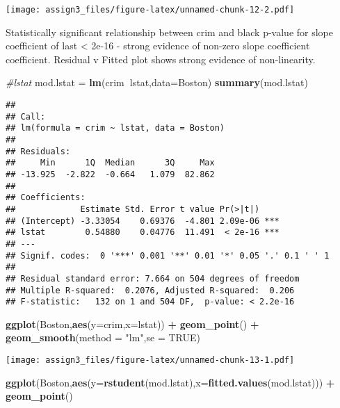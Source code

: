 \documentclass[]{article}
\newenvironment{Shaded}{\begin{snugshade}}{\end{snugshade}}
\newcommand{\CommentTok}[1]{\textcolor[rgb]{0.56,0.35,0.01}{\textit{#1}}}
\newcommand{\DataTypeTok}[1]{\textcolor[rgb]{0.13,0.29,0.53}{#1}}
\newcommand{\KeywordTok}[1]{\textcolor[rgb]{0.13,0.29,0.53}{\textbf{#1}}}
\newcommand{\NormalTok}[1]{#1}
\newcommand{\OperatorTok}[1]{\textcolor[rgb]{0.81,0.36,0.00}{\textbf{#1}}}
\newcommand{\OtherTok}[1]{\textcolor[rgb]{0.56,0.35,0.01}{#1}}
\newcommand{\StringTok}[1]{\textcolor[rgb]{0.31,0.60,0.02}{#1}}
\begin{document}
\texttt{[image: assign3\_files/figure-latex/unnamed-chunk-12-2.pdf]}

Statistically significant relationship between crim and black p-value
for slope coefficient of last \textless{} 2e-16 - strong evidence of
non-zero slope coefficient coefficient. Residual v Fitted plot shows
strong evidence of non-linearity.

\begin{Shaded}
\begin{Highlighting}[]
\CommentTok{#lstat}
\NormalTok{mod.lstat =}\StringTok{ }\KeywordTok{lm}\NormalTok{(crim}\OperatorTok{~}\NormalTok{lstat,}\DataTypeTok{data=}\NormalTok{Boston)}
\KeywordTok{summary}\NormalTok{(mod.lstat)}
\end{Highlighting}
\end{Shaded}

\begin{verbatim}
## 
## Call:
## lm(formula = crim ~ lstat, data = Boston)
## 
## Residuals:
##     Min      1Q  Median      3Q     Max 
## -13.925  -2.822  -0.664   1.079  82.862 
## 
## Coefficients:
##             Estimate Std. Error t value Pr(>|t|)    
## (Intercept) -3.33054    0.69376  -4.801 2.09e-06 ***
## lstat        0.54880    0.04776  11.491  < 2e-16 ***
## ---
## Signif. codes:  0 '***' 0.001 '**' 0.01 '*' 0.05 '.' 0.1 ' ' 1
## 
## Residual standard error: 7.664 on 504 degrees of freedom
## Multiple R-squared:  0.2076, Adjusted R-squared:  0.206 
## F-statistic:   132 on 1 and 504 DF,  p-value: < 2.2e-16
\end{verbatim}

\begin{Shaded}
\begin{Highlighting}[]
\KeywordTok{ggplot}\NormalTok{(Boston,}\KeywordTok{aes}\NormalTok{(}\DataTypeTok{y=}\NormalTok{crim,}\DataTypeTok{x=}\NormalTok{lstat)) }\OperatorTok{+}\StringTok{ }\KeywordTok{geom_point}\NormalTok{() }\OperatorTok{+}\StringTok{ }\KeywordTok{geom_smooth}\NormalTok{(}\DataTypeTok{method =} \StringTok{"lm"}\NormalTok{,}\DataTypeTok{se =} \OtherTok{TRUE}\NormalTok{)}
\end{Highlighting}
\end{Shaded}

\texttt{[image: assign3\_files/figure-latex/unnamed-chunk-13-1.pdf]}

\begin{Shaded}
\begin{Highlighting}[]
\KeywordTok{ggplot}\NormalTok{(Boston,}\KeywordTok{aes}\NormalTok{(}\DataTypeTok{y=}\KeywordTok{rstudent}\NormalTok{(mod.lstat),}\DataTypeTok{x=}\KeywordTok{fitted.values}\NormalTok{(mod.lstat))) }\OperatorTok{+}\StringTok{ }\KeywordTok{geom_point}\NormalTok{() }
\end{Highlighting}
\end{Shaded}
\end{document}
